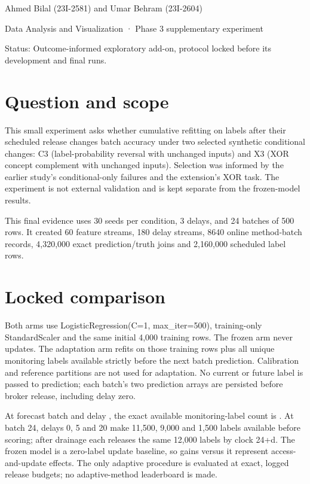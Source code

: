 \documentclass[11pt,a4paper]{article}
\begin{document}
Ahmed Bilal (23I-2581) and Umar Behram (23I-2604)\par
Data Analysis and Visualization · Phase 3 supplementary experiment\par

Status: Outcome-informed exploratory add-on, protocol locked before its development and final runs.\par

\section{Question and scope}

This small experiment asks whether cumulative refitting on labels after their scheduled release changes batch accuracy under two selected synthetic conditional changes: C3 (label-probability reversal with unchanged inputs) and X3 (XOR concept complement with unchanged inputs). Selection was informed by the earlier study's conditional-only failures and the extension's XOR task. The experiment is not external validation and is kept separate from the frozen-model results.\par

This final evidence uses 30 seeds per condition, 3 delays, and 24 batches of 500 rows. It created 60 feature streams, 180 delay streams, 8640 online method-batch records, 4,320,000 exact prediction/truth joins and 2,160,000 scheduled label rows.\par

\section{Locked comparison}

Both arms use LogisticRegression(C=1, max\_\allowbreak{}iter=500), training-only StandardScaler and the same initial 4,000 training rows. The frozen arm never updates. The adaptation arm refits on those training rows plus all unique monitoring labels available strictly before the next batch prediction. Calibration and reference partitions are not used for adaptation. No current or future label is passed to prediction; each batch's two prediction arrays are persisted before broker release, including delay zero.\par

At forecast batch \texttt{} and delay \texttt{}, the exact available monitoring-label count is \texttt{}. At batch 24, delays 0, 5 and 20 make 11,500, 9,000 and 1,500 labels available before scoring; after drainage each releases the same 12,000 labels by clock 24+d. The frozen model is a zero-label update baseline, so gains versus it represent access-and-update effects. The only adaptive procedure is evaluated at exact, logged release budgets; no adaptive-method leaderboard is made.\par
\end{document}
